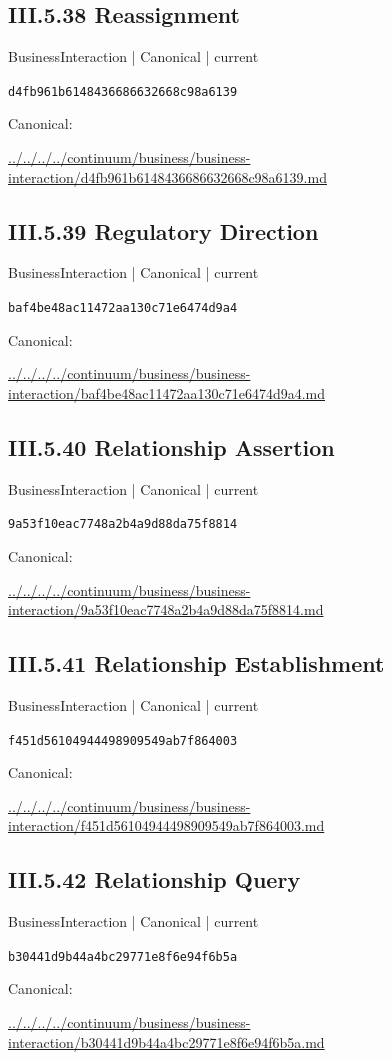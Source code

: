 \documentclass[10pt,a4paper]{article}
\begin{document}
\subsection*{III.5.38 Reassignment}
{\small BusinessInteraction | Canonical | current}\par
\texttt{d4fb961b6148436686632668c98a6139}\par
Canonical: \par
{\footnotesize\url{../../../../continuum/business/business-interaction/d4fb961b6148436686632668c98a6139.md}}\par
\subsection*{III.5.39 Regulatory Direction}
{\small BusinessInteraction | Canonical | current}\par
\texttt{baf4be48ac11472aa130c71e6474d9a4}\par
Canonical: \par
{\footnotesize\url{../../../../continuum/business/business-interaction/baf4be48ac11472aa130c71e6474d9a4.md}}\par
\subsection*{III.5.40 Relationship Assertion}
{\small BusinessInteraction | Canonical | current}\par
\texttt{9a53f10eac7748a2b4a9d88da75f8814}\par
Canonical: \par
{\footnotesize\url{../../../../continuum/business/business-interaction/9a53f10eac7748a2b4a9d88da75f8814.md}}\par
\subsection*{III.5.41 Relationship Establishment}
{\small BusinessInteraction | Canonical | current}\par
\texttt{f451d56104944498909549ab7f864003}\par
Canonical: \par
{\footnotesize\url{../../../../continuum/business/business-interaction/f451d56104944498909549ab7f864003.md}}\par
\subsection*{III.5.42 Relationship Query}
{\small BusinessInteraction | Canonical | current}\par
\texttt{b30441d9b44a4bc29771e8f6e94f6b5a}\par
Canonical: \par
{\footnotesize\url{../../../../continuum/business/business-interaction/b30441d9b44a4bc29771e8f6e94f6b5a.md}}\par
\end{document}
